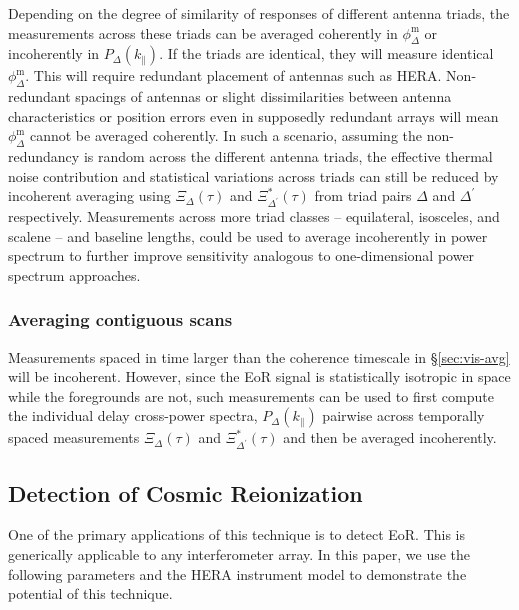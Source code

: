 \documentclass[
reprint,
superscriptaddress,
amsmath,
amssymb,
aps,
prd
]{revtex4-1}
\begin{document}
Depending on the degree of similarity of responses of different antenna triads, the measurements across these triads can be averaged coherently in $\phi_\Delta^\textrm{m}$ or incoherently in $P_\Delta(k_\parallel)$. If the triads are identical, they will measure identical $\phi_\Delta^\textrm{m}$. This will require redundant placement of antennas such as HERA. Non-redundant spacings of antennas or slight dissimilarities between antenna characteristics or position errors even in supposedly redundant arrays will mean $\phi_\Delta^\textrm{m}$ cannot be averaged coherently. In such a scenario, assuming the non-redundancy is random across the different antenna triads, the effective thermal noise contribution  and statistical variations across triads can still be reduced by incoherent averaging using  $\Xi_\Delta(\tau)$ and $\Xi_{\Delta^\prime}^*(\tau)$ from triad pairs $\Delta$ and $\Delta^\prime$ respectively. Measurements across more triad classes -- equilateral, isosceles, and scalene -- and baseline lengths, could be used to average incoherently in power spectrum to further improve sensitivity analogous to one-dimensional power spectrum approaches. 

\subsubsection{Averaging contiguous scans}\label{sec:utc-avg}

Measurements spaced in time larger than the coherence timescale in \S\ref{sec:vis-avg} will be incoherent.  However, since the EoR signal is statistically isotropic in space while the foregrounds are not, such measurements can be used to first compute the individual delay cross-power spectra, $P_\Delta(k_\parallel)$ pairwise across temporally spaced measurements $\Xi_\Delta(\tau)$ and $\Xi_{\Delta^\prime}^*(\tau)$ and then be averaged incoherently. 


\subsection{Detection of Cosmic Reionization}\label{sec:EoR-detection}

One of the primary applications of this technique is to detect EoR. This is generically applicable to any interferometer array. In this paper, we use the following parameters and the HERA instrument model to demonstrate the potential of this technique.
\end{document}
